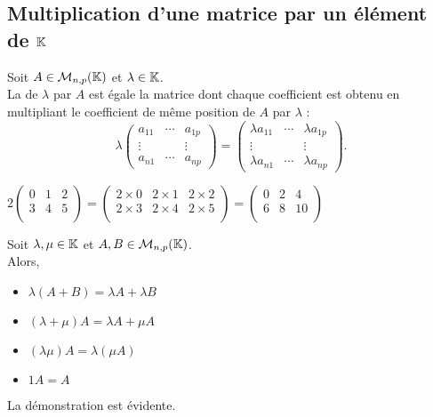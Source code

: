 \documentclass{book}
\begin{document}
\subsection{Multiplication d'une matrice par un élément de \(\mathbb{K}\)}
\begin{Definition}
Soit $A\in \mathcal{M}_{n,p}(\mathbb{K})$ et $\lambda\in\mathbb{K}$.\\
La  de $\lambda$ par $A$ est égale la matrice dont chaque coefficient est obtenu en multipliant le coefficient
de même position de $A$ par $\lambda$ :
$$\lambda \begin{pmatrix}
a_{11} & \cdots & a_{1p}\\
 \vdots &  & \vdots\\
a_{n1} & \cdots & a_{np}
\end{pmatrix}= \begin{pmatrix}
\lambda a_{11} & \cdots & \lambda a_{1p}\\
 \vdots &  & \vdots\\
\lambda a_{n1} & \cdots & \lambda a_{np}
\end{pmatrix}.$$
\end{Definition}
\begin{Exemple}
 $
2\begin{pmatrix}
0 &1 & 2 \\
3 &4 & 5 \\
\end{pmatrix} 
=\begin{pmatrix}
2\times 0 &2\times 1 & 2\times 2 \\
2\times 3 &2\times 4 & 2\times 5 \\
\end{pmatrix} =
\begin{pmatrix}
0 &2 & 4 \\
6 &8 & 10 \\
\end{pmatrix}
$
\end{Exemple}
\begin{Proposition}[Propriétés]
 Soit $\lambda,\mu\in\mathbb{K}$ et $A,B \in \mathcal{M}_{n,p}(\mathbb{K})$.\\
Alors,
\begin{itemize}
\item $\lambda(A + B) = \lambda A + \lambda B$
\item $(\lambda+ \mu)A = \lambda A + \mu A$
\item $(\lambda \mu)A = \lambda(\mu A)$
\item $1A=A$
\end{itemize}
\end{Proposition}
\begin{Demonstration}
La démonstration est évidente. 
\end{Demonstration}
\end{document}
